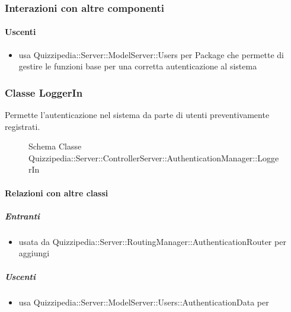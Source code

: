 \subsubsection{Interazioni con altre componenti}
\paragraph{Uscenti}
\begin{itemize}
\item usa Quizzipedia::Server::ModelServer::Users per Package che permette di gestire le funzioni base per una corretta autenticazione al sistema
\end{itemize}
\subsubsection{Classe LoggerIn}
Permette l'autenticazione nel sistema da parte di utenti preventivamente registrati.
\begin{figure}[H]
\centering
\noindent{}
\caption[Schema Classe LoggerIn]{Schema Classe Quizzipedia::Server::ControllerServer::AuthenticationManager::LoggerIn}
\end{figure}
\paragraph{Relazioni con altre classi}
\subparagraph{Entranti}
\begin{itemize}
\item usata da Quizzipedia::Server::RoutingManager::AuthenticationRouter per aggiungi
\end{itemize}
\subparagraph{Uscenti}
\begin{itemize}
\item usa Quizzipedia::Server::ModelServer::Users::AuthenticationData per 
\end{itemize}

